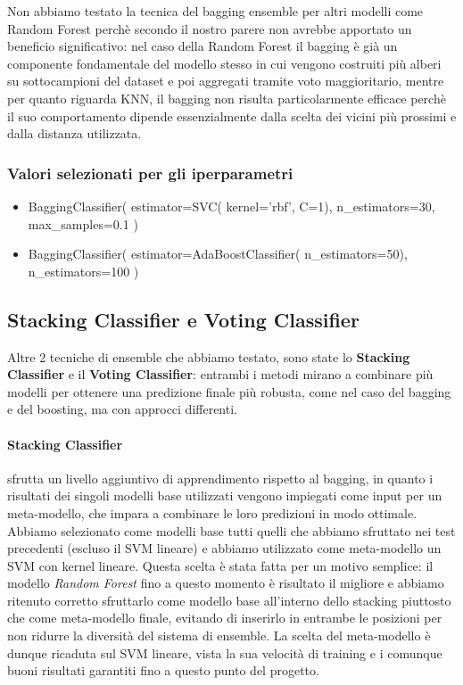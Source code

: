 \documentclass{article}
\begin{document}
\begin{multicols}{2}
Non abbiamo testato la tecnica del bagging ensemble per altri modelli come Random Forest perchè secondo il nostro parere non avrebbe apportato un beneficio significativo: nel caso della Random Forest il bagging è già un componente fondamentale del modello stesso in cui vengono costruiti più alberi su sottocampioni del dataset e poi aggregati tramite voto maggioritario, mentre per quanto riguarda KNN, il bagging non risulta particolarmente efficace perchè il suo comportamento dipende essenzialmente dalla scelta dei vicini più prossimi e dalla distanza utilizzata.

\subsubsection*{Valori selezionati per gli iperparametri}

\begin{itemize}[leftmargin=*]
    \item BaggingClassifier( estimator=SVC( kernel='rbf', C=1), n\_estimators=30, max\_samples=0.1 )
    \item BaggingClassifier( estimator=AdaBoostClassifier( n\_estimators=50), n\_estimators=100 )
\end{itemize}

\subsection{Stacking Classifier e Voting Classifier}

Altre 2 tecniche di ensemble che abbiamo testato, sono state lo \textbf{Stacking Classifier} e il \textbf{Voting Classifier}: entrambi i metodi mirano a combinare più modelli per ottenere una predizione finale più robusta, come nel caso del bagging e del boosting, ma con approcci differenti.

\paragraph{Stacking Classifier} sfrutta un livello aggiuntivo di apprendimento rispetto al bagging, in quanto i risultati dei singoli modelli base utilizzati vengono impiegati come input per un meta-modello, che impara a combinare le loro predizioni in modo ottimale. Abbiamo selezionato come modelli base tutti quelli che abbiamo sfruttato nei test precedenti (escluso il SVM lineare) e abbiamo utilizzato come meta-modello un SVM con kernel lineare. Questa scelta è stata fatta per un motivo semplice: il modello \textit{Random Forest} fino a questo momento è risultato il migliore e abbiamo ritenuto corretto sfruttarlo come modello base all'interno dello stacking piuttosto che come meta-modello finale, evitando di inserirlo in entrambe le posizioni per non ridurre la diversità del sistema di ensemble. La scelta del meta-modello è dunque ricaduta sul SVM lineare, vista la sua velocità di training e i comunque buoni risultati garantiti fino a questo punto del progetto.


\end{multicols}
\end{document}
